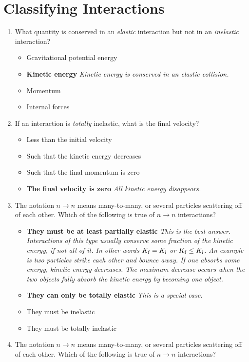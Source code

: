 \documentclass[10pt]{article}
\begin{document}
\section{Classifying Interactions}
\begin{enumerate}
\item What quantity is conserved in an \textit{elastic} interaction but not in an \textit{inelastic} interaction?
\begin{itemize}
\item Gravitational potential energy
\item \textbf{Kinetic energy}  \textit{Kinetic energy is conserved in an elastic collision.}
\item Momentum
\item Internal forces
\end{itemize}
\item If an interaction is \textit{totally} inelastic, what is the final velocity?
\begin{itemize}
\item Less than the initial velocity
\item Such that the kinetic energy decreases
\item Such that the final momentum is zero
\item \textbf{The final velocity is zero}  \textit{All kinetic energy disappears.}
\end{itemize}
\item The notation $n \rightarrow n$ means many-to-many, or several particles scattering off of each other.  Which of the following is true of $n \rightarrow n$ interactions?
\begin{itemize}
\item \textbf{They must be at least partially elastic}  \textit{This is the best answer.  Interactions of this type usually conserve some fraction of the kinetic energy, if not all of it.  In other words $K_{\rm f} = K_{\rm i}$ or $K_{\rm f} \leq K_{\rm i}$.  An example is two particles strike each other and bounce away.  If one absorbs some energy, kinetic energy decreases.  The maximum decrease occurs when the two objects fully absorb the kinetic energy by becoming one object.}
\item \textbf{They can only be totally elastic}  \textit{This is a special case.}
\item They must be inelastic
\item They must be totally inelastic
\end{itemize}
\item The notation $n \rightarrow n$ means many-to-many, or several particles scattering off of each other.  Which of the following is true of $n \rightarrow n$ interactions?

\end{enumerate}
\end{document}
